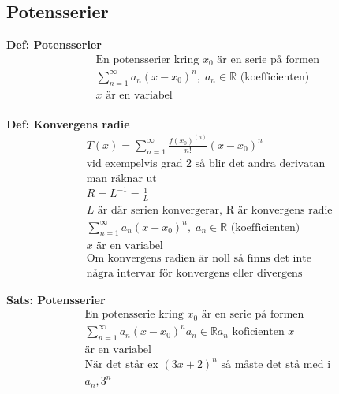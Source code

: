 \begin{multicols}{2}
\subsection{Potensserier}
\textbf{Def: Potensserier}
\begin{align*}
  &\text{En potensserier kring $x_0$ är en serie på formen } \\
  &\displaystyle\sum_{n=1}^{\infty}a_n{(x-x_0)}^n, \; a_n \in \mathbb{R} \text{ (koefficienten)} \\
  &x \text{ är en variabel} \\
\end{align*}

\textbf{Def: Konvergens radie}
\begin{align*}
  &T(x)=\displaystyle\sum_{n=1}^{\infty}\frac{{f(x_0)}^{(n)}}{n!}{(x-x_0)}^n \\
  &\text{vid exempelvis grad 2 så blir det andra derivatan} \\
  &\text{man räknar ut} \\
  &R=L^{-1}=\frac{1}{L} \\
  &L \text{ är där serien konvergerar, R är konvergens radie} \\
  &\displaystyle\sum_{n=1}^{\infty}a_n{(x-x_0)}^n, \; a_n \in \mathbb{R} \text{ (koefficienten)} \\
  &x \text{ är en variabel} \\
  &\text{Om konvergens radien är noll så finns det inte} \\
  &\text{några intervar för konvergens eller divergens}
\end{align*}

\textbf{Sats: Potensserier}
\begin{align*}
  &\text{En potensserie kring } x_0 \text{ är en serie på formen } \\
  &\displaystyle\sum_{n=1}^{\infty}a_n{(x-x_0)}^n a_n \in \mathbb{R} a_n \text{ koficienten } x \\
  &\text{är en variabel} \\
  &\text{När det står ex } {(3x+2)}^n \text{ så måste det stå med i } \\
  &a_n, 3^n \\
\end{align*}


\end{multicols}
